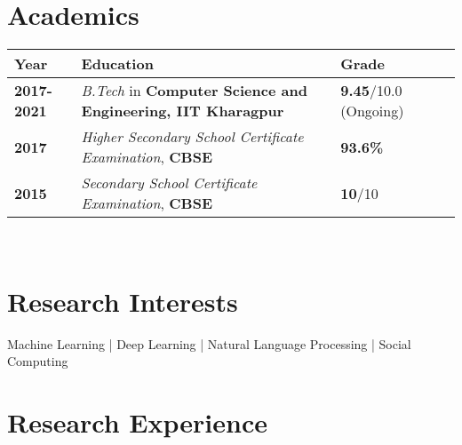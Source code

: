 \documentclass[a4paper,10pt]{extarticle} %
\begin{document}
\vspace{-0.6cm}
\section{\textcolor{primary}{Academics}}

\indent \begin{tabular}{ l @{\hskip 1cm} l @{\hskip 2.5cm} l @{\hskip 1.8cm} l }
\textbf{Year} & \textbf{Education} & \textbf{Grade}\\
\hline
\textbf{2017-2021} & \textit{B.Tech} in \textbf{Computer Science and Engineering, IIT Kharagpur} & \textbf{9.45}/10.0 (Ongoing) \\
\textbf{2017} & \textit{Higher Secondary School Certificate Examination}, \textbf{CBSE} & \textbf{93.6\%} \\
\textbf{2015} & \textit{Secondary School Certificate Examination}, \textbf{CBSE} & \textbf{10}/10\\
\end{tabular} \\


\vspace{-0.3cm}
\section{\textcolor{primary}{Research Interests}}

\noindent Machine Learning | Deep Learning | Natural Language Processing | Social Computing



\section{\textcolor{primary}{Research Experience}}
\end{document}
